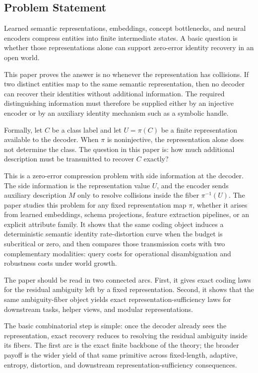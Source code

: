 \subsection{Problem Statement}

Learned semantic representations, embeddings, concept bottlenecks, and neural encoders compress entities into finite intermediate states. A basic question is whether those representations alone can support zero-error identity recovery in an open world.

This paper proves the answer is no whenever the representation has collisions. If two distinct entities map to the same semantic representation, then no decoder can recover their identities without additional information. The required distinguishing information must therefore be supplied either by an injective encoder or by an auxiliary identity mechanism such as a symbolic handle.

Formally, let $C$ be a class label and let $U=\pi(C)$ be a finite representation available to the decoder. When $\pi$ is noninjective, the representation alone does not determine the class. The question in this paper is: how much additional description must be transmitted to recover $C$ exactly?

This is a zero-error compression problem with side information at the decoder. The side information is the representation value $U$, and the encoder sends auxiliary description $M$ only to resolve collisions inside the fiber $\pi^{-1}(U)$. The paper studies this problem for any fixed representation map $\pi$, whether it arises from learned embeddings, schema projections, feature extraction pipelines, or an explicit attribute family. It shows that the same coding object induces a deterministic semantic identity rate-distortion curve when the budget is subcritical or zero, and then compares those transmission costs with two complementary modalities: query costs for operational disambiguation and robustness costs under world growth.

The paper should be read in two connected arcs. First, it gives exact coding laws for the residual ambiguity left by a fixed representation. Second, it shows that the same ambiguity-fiber object yields exact representation-sufficiency laws for downstream tasks, helper views, and modular representations.

The basic combinatorial step is simple: once the decoder already sees the representation, exact recovery reduces to resolving the residual ambiguity inside its fibers. The first arc is the exact finite backbone of the theory; the broader payoff is the wider yield of that same primitive across fixed-length, adaptive, entropy, distortion, and downstream representation-sufficiency consequences.

